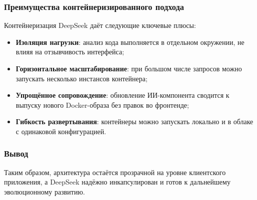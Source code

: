 \subsubsection{Преимущества контейнеризированного подхода}
Контейнеризация DeepSeek даёт следующие ключевые плюсы:
\begin{itemize}
  \item \textbf{Изоляция нагрузки}: анализ кода выполняется в отдельном окружении, не влияя на отзывчивость интерфейса;
  \item \textbf{Горизонтальное масштабирование}: при большом числе запросов можно запускать несколько инстансов контейнера;
  \item \textbf{Упрощённое сопровождение}: обновление ИИ-компонента сводится к выпуску нового Docker-образа без правок во фронтенде;
  \item \textbf{Гибкость развертывания}: контейнеры можно запускать локально и в облаке с одинаковой конфигурацией.
\end{itemize}

\subsubsection{Вывод}
Таким образом, архитектура остаётся прозрачной на уровне клиентского приложения, а DeepSeek надёжно инкапсулирован и готов к дальнейшему эволюционному развитию.
